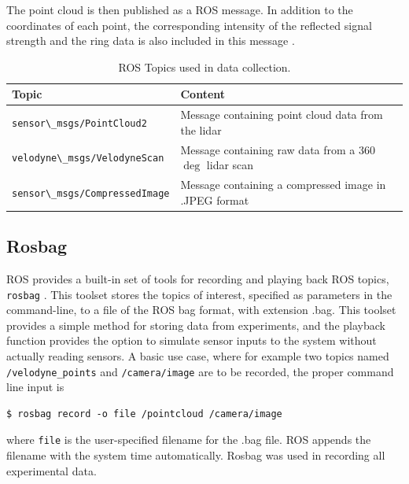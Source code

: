 \noindent The point cloud is then published as a ROS message. In addition to the coordinates of each point, the corresponding intensity of the reflected signal strength and the ring data is also included in this message \cite{velodyne_driver}.\\
\begin{table}[H]
	\centering
	\begin{tabularx}{.8\linewidth}{l L}\toprule
		\textbf{Topic} & \textbf{Content} \\\midrule
		\lstinline[basicstyle=\ttfamily]{sensor\_msgs/PointCloud2} & Message containing point cloud data from the lidar \\\midrule
		\lstinline[basicstyle=\ttfamily]{velodyne\_msgs/VelodyneScan} & Message containing raw data from a 360$\deg$ lidar scan \\\midrule
		\lstinline[basicstyle=\ttfamily]{sensor\_msgs/CompressedImage} & Message containing a compressed image in .JPEG format\\\midrule
		\end{tabularx}
	\caption{ROS Topics used in data collection.}
	\label{tab:topics}
\end{table}
\subsection{Rosbag}
ROS provides a built-in set of tools for recording and playing back ROS topics, \lstinline[basicstyle=\ttfamily]{rosbag} \cite{rosbag}. This toolset stores the topics of interest, specified as parameters in the command-line, to a file of the ROS bag format, with extension .bag. This toolset provides a simple method for storing data from experiments, and the playback function provides the option to simulate sensor inputs to the system without actually reading sensors. A basic use case, where for example two topics named \lstinline[basicstyle=\ttfamily]{/velodyne_points} and \lstinline[basicstyle=\ttfamily]{/camera/image} are to be recorded, the proper command line input is 
\begin{lstlisting}[basicstyle=\ttfamily]
	$ rosbag record -o file /pointcloud /camera/image
\end{lstlisting}
where \lstinline[basicstyle=\ttfamily]{file} is the user-specified filename for the .bag file. ROS appends the filename with the system time automatically. Rosbag was used in recording all experimental data.
